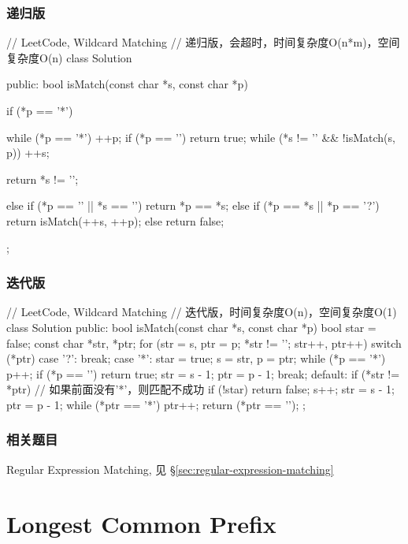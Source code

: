 \subsubsection{递归版}
\begin{Code}
// LeetCode, Wildcard Matching
// 递归版，会超时，时间复杂度O(n*m)，空间复杂度O(n)
class Solution {
public:
    bool isMatch(const char *s, const char *p) {
        if (*p == '*') {
            while (*p == '*') ++p;
            if (*p == '\0') return true;
            while (*s != '\0' && !isMatch(s, p)) ++s;

            return *s != '\0';
        }
        else if (*p == '\0' || *s == '\0') return *p == *s;
        else if (*p == *s || *p == '?') return isMatch(++s, ++p);
        else return false;
    }
};
\end{Code}


\subsubsection{迭代版}
\begin{Code}
// LeetCode, Wildcard Matching
// 迭代版，时间复杂度O(n)，空间复杂度O(1)
class Solution {
public:
    bool isMatch(const char *s, const char *p) {
        bool star = false;
        const char *str, *ptr;
        for (str = s, ptr = p; *str != '\0'; str++, ptr++) {
            switch (*ptr) {
            case '?':
                break;
            case '*':
                star = true;
                s = str, p = ptr;
                while (*p == '*') p++;
                if (*p == '\0') return true;
                str = s - 1;
                ptr = p - 1;
                break;
            default:
                if (*str != *ptr) {
                    // 如果前面没有'*'，则匹配不成功
                    if (!star) return false;
                    s++;
                    str = s - 1;
                    ptr = p - 1;
                }
            }
        }
        while (*ptr == '*') ptr++;
        return (*ptr == '\0');
    }
};
\end{Code}


\subsubsection{相关题目}
\begindot
\item Regular Expression Matching, 见 \S \ref{sec:regular-expression-matching}
\myenddot


\section{Longest Common Prefix} %
\label{sec:longest-common-prefix}


